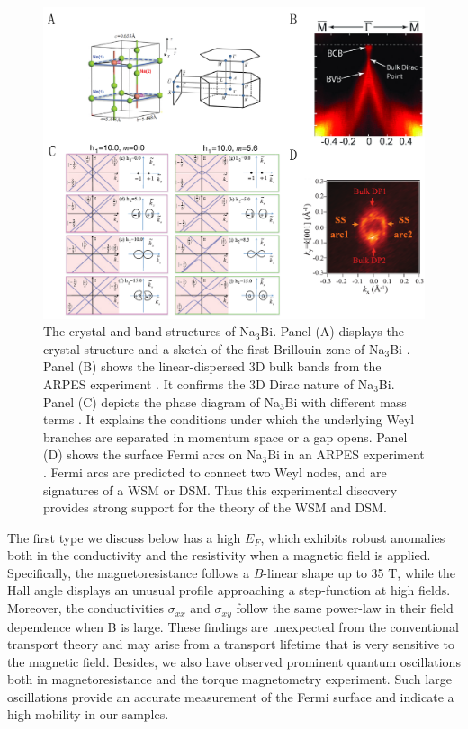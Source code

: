 \begin{figure}[!htbp]
  \begin{center}
\includegraphics[width=1\linewidth]{ch-na3bi/figures/Na3Bi_band.pdf}
\caption{\label{figNa3Bi_band} The crystal and band structures of Na$_3$Bi. Panel (A) displays the crystal structure and a sketch of the first Brillouin zone of Na$_3$Bi \cite{Wang2012}. Panel (B) shows the linear-dispersed 3D bulk bands from the ARPES experiment \cite{Liu2014a}. It confirms the 3D Dirac nature of Na$_3$Bi. Panel (C) depicts the phase diagram of Na$_3$Bi with different mass terms \cite{Wang2012}. It explains the conditions under which the underlying Weyl branches are separated in momentum space or a gap opens. Panel (D) shows the surface Fermi arcs on Na$_3$Bi in an ARPES experiment \cite{Xu2015}. Fermi arcs are predicted to connect two Weyl nodes, and are signatures of a WSM or DSM. Thus this experimental discovery provides strong support for the theory of the WSM and DSM.
}
  \end{center}
\end{figure}

The first type we discuss below has a high $E_F$, which exhibits robust anomalies both in the conductivity and the resistivity when a magnetic field is applied\cite{Xiong2015a}. Specifically, the magnetoresistance follows a $B$-linear shape up to 35 T, while the Hall angle displays an unusual profile approaching a step-function at high fields. Moreover, the conductivities $\sigma_{xx}$ and $\sigma_{xy}$ follow the same power-law in their field dependence when B is large. These findings are unexpected from the conventional transport theory and may arise from a transport lifetime that is very sensitive to the magnetic field. Besides, we also have observed prominent quantum oscillations both in magnetoresistance and the torque magnetometry experiment. Such large oscillations provide an accurate measurement of the Fermi surface and indicate a high mobility in our samples.

